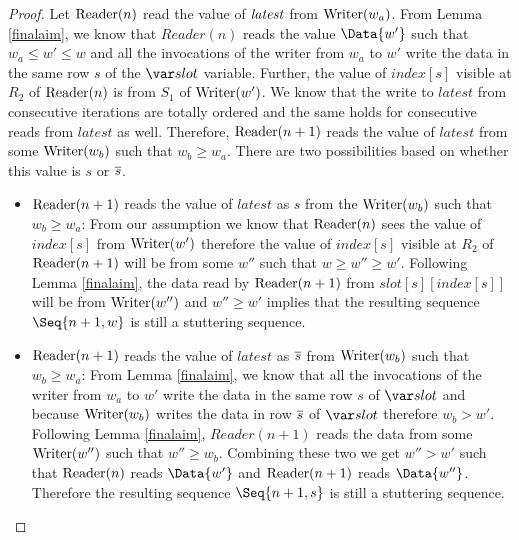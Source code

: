 \begin{description}
\begin{proof}
Let $\mathrm{Reader}(n)$ read the value of $\mathit{latest}$ from $\mathrm{Writer}(w_a)$.
From Lemma \ref{finalaim}, we know that $Reader(n)$
reads the value $\Data{w'}$ such that $w_a \le w' \le w$ and all the invocations of the writer from $w_a$ to $w'$ write the data in the same row $s$ of the $\slot$ variable.
Further, the value of $index[s]$ visible at $R_2$ of $\mathrm{Reader}(n)$ is from $S_1$ of $\mathrm{Writer}(w')$. We know that the write to $latest$ from consecutive iterations are totally ordered and 
the same holds for consecutive reads from $latest$ as well.  
Therefore, $\mathrm{Reader}(n+1)$ reads the value of $latest$ from some $\mathrm{Writer}(w_b)$ such that $w_b \ge w_a$. There are two possibilities based on whether this value is $s$ or $\overline{s}$.
\begin{itemize}
\item $\mathrm{Reader}(n+1)$ reads the value of $latest$ as $s$ from the $\mathrm{Writer}(w_b)$ such that $w_b \ge w_a$: From our assumption we know that $\mathrm{Reader}(n)$ sees the value of $index[s]$ from 
$\mathrm{Writer}(w')$ therefore the value of $index[s]$ visible at $R_2$ of $\mathrm{Reader}(n+1)$ will be from some $w''$ such that $w\ge w''\ge w'$. 
Following Lemma \ref{finalaim},  the data read by 
$\mathrm{Reader}(n+1)$ from $slot[s][index[s]]$ will be from $\mathrm{Writer}(w'')$ and $w''\ge w'$ implies that the resulting sequence $\Seq{n+1,w}$ is still a stuttering sequence.

\item  $\mathrm{Reader}(n+1)$ reads the value of $latest$ as $\overline{s}$ from $\mathrm{Writer}(w_b)$ such that $w_b \ge w_a$: From Lemma \ref{finalaim}, we know that all the invocations of the writer from 
$w_a$ to $w'$ write the data in the same row $s$ of $\slot$ and because $\mathrm{Writer}(w_b)$ writes the data in row $\overline{s}$ of $\slot$ therefore $w_b > w'$. Following Lemma \ref{finalaim}, $Reader(n+1)$ reads the data from some $\mathrm{Writer}(w'')$ such that $w''\ge w_b$. Combining these two we get $w''>w'$ such that $\mathrm{Reader}(n)$ reads $\Data{w'}$ and $\mathrm{Reader}(n+1)$ reads $\Data{w''}$. Therefore the 
resulting sequence $\Seq{n+1,s}$ is still a stuttering sequence.
\end{itemize}



\end{proof}



\end{description}
